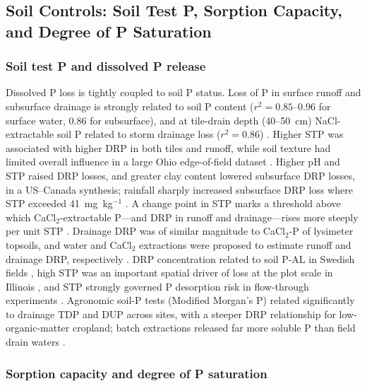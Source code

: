 \documentclass[11pt]{article}
\begin{document}
\subsection{Soil Controls: Soil Test P, Sorption Capacity, and Degree of P Saturation}

\subsubsection{Soil test P and dissolved P release}

Dissolved P loss is tightly coupled to soil P status. Loss of P in surface runoff and
subsurface drainage is strongly related to soil P content
($r^2 = 0.85$--0.96 for surface water, 0.86 for subsurface), and at tile-drain depth
(40--50~cm) NaCl-extractable soil P related to storm drainage loss ($r^2=0.86$)
\parencite{Sharpley1995}. Higher STP was associated with higher DRP in both tiles and
runoff, while soil texture had limited overall influence in a large Ohio edge-of-field
dataset \parencite{Osterholz2020}. Higher pH and STP raised DRP losses, and greater
clay content lowered subsurface DRP losses, in a US--Canada synthesis; rainfall sharply
increased subsurface DRP loss where STP exceeded 41~mg~kg$^{-1}$
\parencite{Ni2020}. A change point in STP marks a threshold above which
CaCl$_2$-extractable P---and DRP in runoff and drainage---rises more steeply per unit
STP \parencite{McDowell2001b}. Drainage DRP was of similar magnitude to CaCl$_2$-P of
lysimeter topsoils, and water and CaCl$_2$ extractions were proposed to estimate runoff
and drainage DRP, respectively \parencite{McDowell2001b}. DRP concentration related to
soil P-AL in Swedish fields \parencite{Ulén2016}, high STP was an important spatial
driver of loss at the plot scale in Illinois \parencite{deOliveira2022}, and STP
strongly governed P desorption risk in flow-through experiments
\parencite{Mumbi2024}. Agronomic soil-P tests (Modified Morgan's P) related
significantly to drainage TDP and DUP across sites, with a steeper DRP relationship for
low-organic-matter cropland; batch extractions released far more soluble P than field
drain waters \parencite{Stutter2018}.

\subsubsection{Sorption capacity and degree of P saturation}
\end{document}
